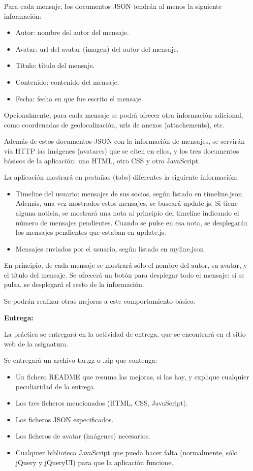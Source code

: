 Para cada mensaje, los documentos JSON tendrán al menos la siguiente información:

\begin{itemize}
\item Autor: nombre del autor del mensaje.
\item Avatar: url del avatar (imagen) del autor del mensaje.
\item Título: título del mensaje.
\item Contenido: contenido del mensaje.
\item Fecha: fecha en que fue escrito el mensaje.
\end{itemize}

Opcionalmente, para cada mensaje se podrá ofrecer otra información adicional, como coordenadas de geolocalización, urls de anexos (attachements), etc.

Además de estos documentos JSON con la información de mensajes, se servirán vía HTTP las imágenes (avatares) que se citen en ellos, y los tres documentos básicos de la aplicación: uno HTML, otro CSS y otro JavaScript.

La aplicación mostrará en pestañas (tabs) diferentes la siguiente información:

\begin{itemize}
\item Timeline del usuario: mensajes de sus socios, según listado en timeline.json. Además, una vez mostrados estos mensajes, se buscará update.js. Si tiene alguna noticia, se mostrará una nota al principio del timeline indicando el número de mensajes pendientes. Cuando se pulse en esa nota, se desplegarán los mensajes pendientes que estaban en update.js.
\item Mensajes enviados por el usuario, según listado en myline.json
\end{itemize}

En principio, de cada mensaje se mostrará sólo el nombre del autor, su avatar, y el título del mensaje. Se ofrecerá un botón para desplegar todo el mensaje: si se pulsa, se desplegará el resto de la información.

Se podrán realizar otras mejoras a este comportamiento básico.

\textbf{Entrega:}

La práctica se entregará en la actividad de entrega, que se encontrará en el sitio web de la asignatura.

Se entregará un archivo tar.gz o .zip que contenga:

\begin{itemize}
\item Un fichero README que resuma las mejoras, si las hay, y explique cualquier peculiaridad de la entrega.
\item Los tres ficheros mencionados (HTML, CSS, JavaScript).
\item Los ficheros JSON especificados.
\item Los ficheros de avatar (imágenes) necesarios.
\item Cualquier biblioteca JavaScript que pueda hacer falta (normalmente, sólo jQuery y jQueryUI) para que la aplicación funcione.
\end{itemize}

